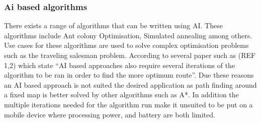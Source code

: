 \subsubsection{Ai based algorithms}
There exists a range of algorithms that can be written using AI. These algorithms include Ant colony Optimisation, Simulated annealing among others. Use cases for these algorithms are used to solve complex optimisation problems such as the traveling salesman problem. According to several paper such as (REF 1,2) which state “AI based approaches also require several iterations of the algorithm to be ran in order to find the more optimum route”. Due these reasons an AI based approach is not suited the desired application as path finding around a fixed map is better solved by other algorithms such as A*. In addition the multiple iterations needed for the algorithm run make it unsuited to be put on a mobile device where processing power, and battery are both limited.  